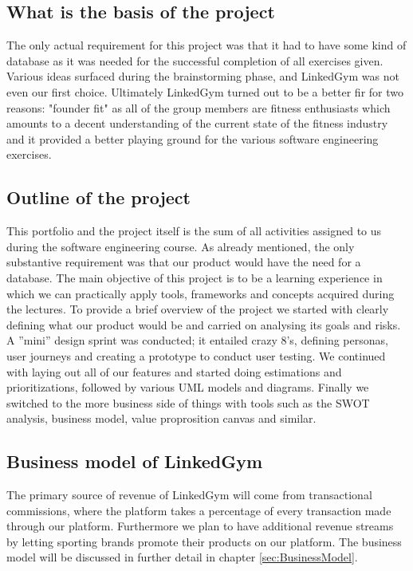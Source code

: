 \subsection{What is the basis of the project}

The only actual requirement for this project was that it had to have some kind of database as it was needed for the successful completion of all exercises given.
Various ideas surfaced during the brainstorming phase, and LinkedGym was not even our first choice. Ultimately LinkedGym turned out to be a better fir for two reasons: "founder fit" as all of the group members are fitness enthusiasts which amounts to a decent understanding of the current state of the fitness industry and it provided a better playing ground for the various software engineering exercises.

\subsection{Outline of the project}

This portfolio and the project itself is the sum of all activities assigned to us during the software engineering course. As already mentioned, the only substantive requirement was that our product would have the need for a database. The main objective of this project is to be a learning experience in which we can practically apply tools, frameworks and concepts acquired during the lectures.
To provide a brief overview of the project we started with clearly defining what our product would be and carried on analysing its goals and risks. A ''mini'' design sprint was conducted; it entailed crazy 8's, defining personas, user journeys and creating a prototype to conduct user testing. We continued with laying out all of our features and started doing estimations and prioritizations, followed by various UML models and diagrams. Finally we switched to the more business side of things with tools such as the SWOT analysis, business model, value proprosition canvas and similar.

\subsection{Business model of LinkedGym}

The primary source of revenue of LinkedGym will come from transactional commissions, where the platform takes a percentage of every transaction made through our platform. Furthermore we plan to have additional revenue streams by letting sporting brands promote their products on our platform.
The business model will be discussed in further detail in chapter \ref{sec:BusinessModel}.

